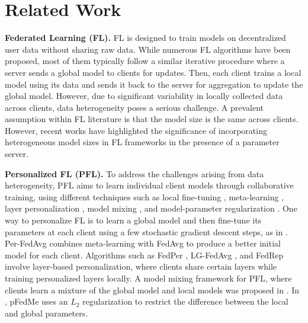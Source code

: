\section{Related Work}
\label{relatedwork}
\textbf{Federated Learning (FL).} FL is designed to train models on decentralized user data without sharing raw data. While numerous FL algorithms \citep{mcmahan2017communication, karimireddy2020scaffold, li2020federated, Lin2020, elgabli22a} have been proposed, most of them typically follow a similar iterative procedure where a server sends a global model to clients for updates. Then, each client trains a local model using its data and sends it back to the server for aggregation to update the global model. However, due to significant variability in locally collected data across clients, data heterogeneity poses a serious challenge. A prevalent assumption within FL literature is that the model size is the same across clients. However, recent works \citep{zhang2022hybrid, liu2022no} have highlighted the significance of incorporating heterogeneous model sizes in FL frameworks in the presence of a parameter server.

\textbf{Personalized FL (PFL).} To address the challenges arising from data heterogeneity, PFL aims to learn individual client models through collaborative training, using different techniques such as local fine-tuning \citep{wang2019federated, yu2020salvaging}, meta-learning \citep{fallah2020personalized,chen2018federated, jiang2019improving}, layer personalization \citep{arivazhagan2019federated, liang2020think, collins2021exploiting}, model mixing \citep{hanzely2020federated, deng2020adaptive}, and model-parameter regularization \citep{t2020personalized, li2021ditto, huang2021personalized, liu2022privacy}. One way to personalize FL is to learn a global model and then fine-tune its parameters at each client using a few stochastic gradient descent steps, as in \citep{yu2020salvaging}. Per-FedAvg \citep{fallah2020personalized} combines meta-learning with FedAvg to produce a better initial model for each client. Algorithms such as FedPer \citep{arivazhagan2019federated}, LG-FedAvg \citep{liang2020think}, and FedRep \citep{collins2021exploiting} involve layer-based personalization, where clients share certain layers while training personalized layers locally.  A model mixing framework for PFL, where clients learn a mixture of the global model and local models was proposed in \citep{hanzely2020federated}. In \citep{t2020personalized}, pFedMe uses an $L_2$ regularization to restrict the difference between the local and global parameters. 

